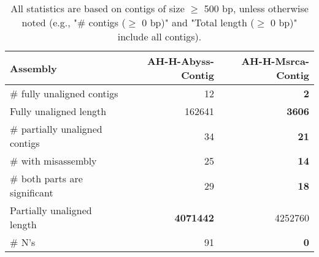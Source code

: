 \documentclass[12pt,a4paper]{article}
\begin{document}
\begin{table}[ht]
\begin{center}
\caption{All statistics are based on contigs of size $\geq$ 500 bp, unless otherwise noted (e.g., "\# contigs ($\geq$ 0 bp)" and "Total length ($\geq$ 0 bp)" include all contigs).}
\begin{tabular}{|l*{2}{|r}|}
\hline
Assembly & AH-H-Abyss-Contig & AH-H-Msrca-Contig \\ \hline
\# fully unaligned contigs & 12 & {\bf 2} \\ \hline
Fully unaligned length & 162641 & {\bf 3606} \\ \hline
\# partially unaligned contigs & 34 & {\bf 21} \\ \hline
\hspace{5mm}\# with misassembly & 25 & {\bf 14} \\ \hline
\hspace{5mm}\# both parts are significant & 29 & {\bf 18} \\ \hline
Partially unaligned length & {\bf 4071442} & 4252760 \\ \hline
\# N's & 91 & {\bf 0} \\ \hline
\end{tabular}
\end{center}
\end{table}
\end{document}
